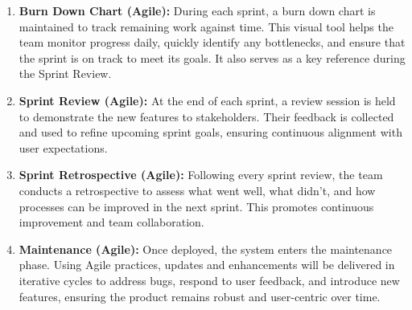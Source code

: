 \documentclass[oneside]{utmthesis}
\begin{document}
\begin{enumerate}[label= (\alph*)]
\begin{enumerate}[label= (\roman*)]
              \item \textit{Sprint 4 – Interactive Learning Module:} This sprint covers vocabulary learning features such as word search, saving vocabulary, bookmarking video segments, and reporting translation errors to enhance content accuracy.

              \item \textit{Sprint 5 – Assessment Module:} This sprint implements the review and testing features. It includes generating flashcards from saved vocabulary and auto-generating quizzes based on the user’s learning history.

              \item \textit{Sprint 6 – Deployment Sprint:} Final integration and testing of all modules are conducted in this sprint. The system is deployed to the live environment with final checks, performance optimizations, and documentation.
          \end{enumerate}

    \item \textbf{Burn Down Chart (Agile):} During each sprint, a burn down chart is maintained to track remaining work against time. This visual tool helps the team monitor progress daily, quickly identify any bottlenecks, and ensure that the sprint is on track to meet its goals. It also serves as a key reference during the Sprint Review.

    \item \textbf{Sprint Review (Agile):} At the end of each sprint, a review session is held to demonstrate the new features to stakeholders. Their feedback is collected and used to refine upcoming sprint goals, ensuring continuous alignment with user expectations.

    \item \textbf{Sprint Retrospective (Agile):} Following every sprint review, the team conducts a retrospective to assess what went well, what didn’t, and how processes can be improved in the next sprint. This promotes continuous improvement and team collaboration.

    \item \textbf{Maintenance (Agile):} Once deployed, the system enters the maintenance phase. Using Agile practices, updates and enhancements will be delivered in iterative cycles to address bugs, respond to user feedback, and introduce new features, ensuring the product remains robust and user-centric over time.
\end{enumerate}
\end{document}
